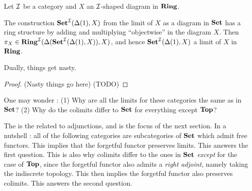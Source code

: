 \begin{prop}
  
  Let $\mathcal{I}$ be a category and $X$ an $\mathcal{I}$-shaped diagram in $\mathbf{Ring}$.

  The construction $\mathbf{Set}^{\mathcal{I}}(\Delta(1),X)$ from 
  the limit of $X$ as a diagram in $\mathbf{Set}$ has a ring structure by
  adding and multiplying ``objectwise'' in the diagram $X$.
  Then $\pi_X \in \mathbf{Ring}^{\mathcal{I}}(\Delta(\mathbf{Set}^{\mathcal{I}}(\Delta(1),X)),X)$,
  and hence $\mathbf{Set}^{\mathcal{I}}(\Delta(1),X)$ a limit of $X$ in $\mathbf{Ring}$.

  Dually, things get nasty. 
\end{prop}
\begin{proof}
  (Nasty things go here)
  (TODO)
\end{proof}

\begin{rmk}
  One may wonder : 
  (1) Why are all the limits for these categories the same as in $\mathbf{Set}$? 
  (2) Why do the colimits differ to $\mathbf{Set}$ for everything except $\mathbf{Top}$?

  The  is the related to adjunctions,
  and is the focus of the next section. 
  In a nutshell : 
  all of the following categories are subcategories of $\mathbf{Set}$
  which admit free functors. 
  This implies that the forgetful functor preserves limits.
  This answers the first question. 
  This is also why colimits differ to the ones in $\mathbf{Set}$
  \emph{except} for the case of $\mathbf{Top}$,
  since the forgetful functor also admits a \emph{right adjoint},
  namely taking the indiscrete topology. 
  This then implies the forgetful functor also preserves colimits.
  This answers the second question.
\end{rmk}